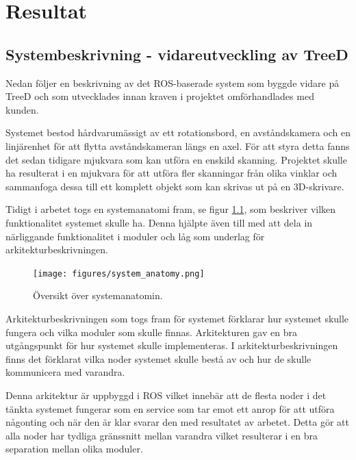 \chapter{Resultat}
\label{cha:results}

\section{Systembeskrivning - vidareutveckling av TreeD}
\label{cha:results-systembeskrivning-treed}

Nedan följer en beskrivning av det ROS-baserade system som byggde vidare på TreeD och som utvecklades innan kraven i projektet omförhandlades med kunden.

Systemet bestod hårdvarumässigt av ett rotationsbord, en avståndskamera och en linjärenhet för att flytta avståndskameran längs en axel. För att styra detta fanns det sedan tidigare mjukvara som kan utföra en enskild skanning. Projektet skulle ha resulterat i en mjukvara för att utföra fler skanningar från olika vinklar och sammanfoga dessa till ett komplett objekt som kan skrivas ut på en 3D-skrivare.

Tidigt i arbetet togs en systemanatomi fram, se figur \ref{fig:system_anatomy}, som beskriver vilken funktionalitet systemet skulle ha. Denna hjälpte även till med att dela in närliggande funktionalitet i moduler och låg som underlag för arkitekturbeskrivningen.

\begin{figure}[H]
	\centering{\tiny }
	\texttt{[image: figures/system\_anatomy.png]}
	\caption{Översikt över systemanatomin.}
	\label{fig:system_anatomy}
\end{figure}


Arkitekturbeskrivningen som togs fram för systemet förklarar hur systemet skulle fungera och vilka moduler som skulle finnas. Arkitekturen gav en bra utgångspunkt för hur systemet skulle implementeras. I arkitekturbeskrivningen finns det förklarat vilka noder systemet skulle bestå av och hur de skulle kommunicera med varandra.

Denna arkitektur är uppbyggd i ROS vilket innebär att de flesta noder i det tänkta systemet fungerar som en service som tar emot ett anrop för att utföra någonting och när den är klar svarar den med resultatet av arbetet. Detta gör att alla noder har tydliga gränssnitt mellan varandra vilket resulterar i en bra separation mellan olika moduler.

